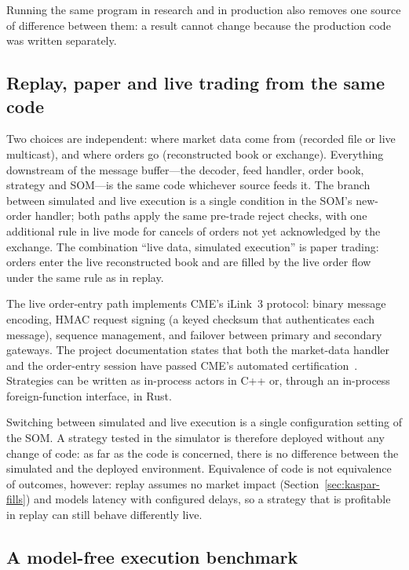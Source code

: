 Running the same program in research and in production also removes one source of difference between them: a
result cannot change because the production code was written separately.


\subsection{Replay, paper and live trading from the same code}
\label{sec:kaspar-equivalence}

Two choices are independent: where market data come from (recorded file or live multicast), and
where orders go (reconstructed book or exchange). Everything downstream of the message buffer---the
decoder, feed handler, order book, strategy and SOM---is the same code whichever source feeds it.
The branch between simulated and live execution is a single condition in the SOM's new-order
handler; both paths apply the same pre-trade reject checks, with one additional rule in live mode
for cancels of orders not yet acknowledged by the exchange. The combination ``live data, simulated
execution'' is paper trading: orders enter the live reconstructed book and are filled by the live
order flow under the same rule as in replay.

The live order-entry path implements CME's iLink~3 protocol: binary message encoding, HMAC request
signing (a keyed checksum that authenticates each message), sequence management, and failover between primary and secondary gateways. The project
documentation states that both the market-data handler and the order-entry session have passed CME's
automated certification~\citep{kaspar_hft}. Strategies can be written as in-process actors in C++ or, through an
in-process foreign-function interface, in Rust.

Switching between simulated and live execution is a single configuration setting of the SOM. A strategy tested in
the simulator is therefore deployed without any change of code: as far as the code is concerned, there is no
difference between the simulated and the deployed environment. Equivalence of code is
not equivalence of outcomes, however: replay assumes no
market impact (Section~\ref{sec:kaspar-fills}) and models latency with configured delays, so a strategy
that is profitable in replay can still behave differently live.


\subsection{A model-free execution benchmark}
\label{sec:shadow}

